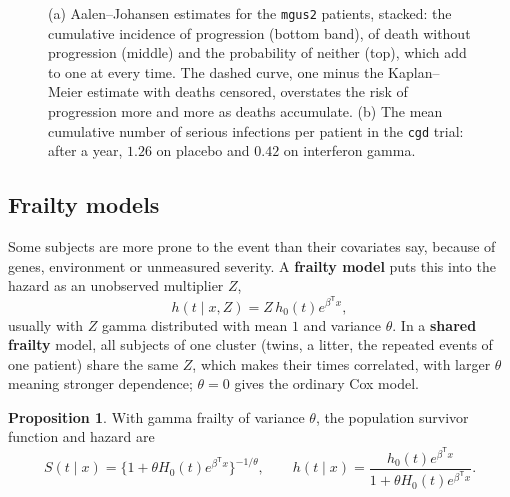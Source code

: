 \documentclass[11pt,a4paper]{article}
\numberwithin{equation}{section}
\theoremstyle{definition}
\newtheorem{prop}[thm]{Proposition}
\begin{document}
\begin{figure}[H]
\caption{(a) Aalen--Johansen estimates for the \texttt{mgus2} patients, stacked: the cumulative incidence of progression (bottom band), of death without progression (middle) and the probability of neither (top), which add to one at every time. The dashed curve, one minus the Kaplan--Meier estimate with deaths censored, overstates the risk of progression more and more as deaths accumulate. (b) The mean
cumulative number of serious infections per patient in the \texttt{cgd} trial: after a year, $1.26$ on placebo and $0.42$ on interferon gamma.}
\label{fig:cif}
\end{figure}

\subsection{Frailty models}
\label{ssec:frailty}

Some subjects are more prone to the event than their covariates say, because of genes, environment or unmeasured severity. A \textbf{frailty model} puts this into the hazard as an unobserved multiplier $Z$,
\[
h(t \mid x, Z) = Z\,h_0(t)e^{\beta^{\mathsf T}x} ,
\]
usually with $Z$ gamma distributed with mean $1$ and variance $\theta$. In a \textbf{shared frailty} model, all subjects of one cluster (twins, a litter, the repeated events of one patient) share the same $Z$, which makes their times correlated, with larger $\theta$ meaning stronger dependence; $\theta = 0$ gives the ordinary Cox model.

\begin{prop}
\label{prop:gammafrailty}
With gamma frailty of variance $\theta$, the population survivor function and hazard are
\[
S(t \mid x) = \big\{1 + \theta H_0(t)e^{\beta^{\mathsf T}x}\big\}^{-1/\theta} , \qquad h(t \mid x) = \frac{h_0(t)e^{\beta^{\mathsf T}x}}{1 + \theta H_0(t)e^{\beta^{\mathsf T}x}} .
\]
\end{prop}
\end{document}
